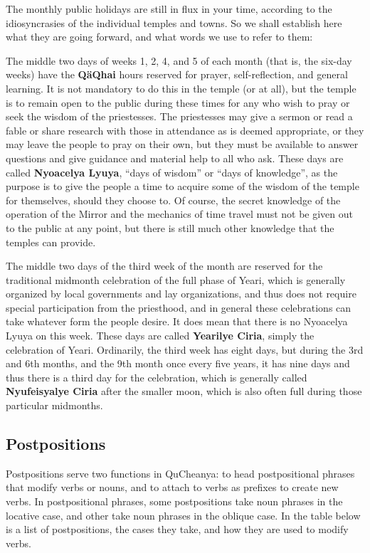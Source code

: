 \documentclass{article}
\begin{document}
The monthly public holidays are still in flux in your time, according to the idiosyncrasies of the individual temples and towns.  So we shall establish here what they are going forward, and what words we use to refer to them:

The middle two days of weeks 1, 2, 4, and 5 of each month (that is, the six-day weeks) have the \textbf{Q\"aQhai} hours reserved for prayer, self-reflection, and general learning.  It is not mandatory to do this in the temple (or at all), but the temple is to remain open to the public during these times for any who wish to pray or seek the wisdom of the priestesses.  The priestesses may give a sermon or read a fable or share research with those in attendance as is deemed appropriate, or they may leave the people to pray on their own, but they must be available to answer questions and give guidance and material help to all who ask.  These days are called \textbf{Nyoacelya Lyuya}, ``days of wisdom'' or ``days of knowledge'', as the purpose is to give the people a time to acquire some of the wisdom of the temple for themselves, should they choose to.  Of course, the secret knowledge of the operation of the Mirror and the mechanics of time travel must not be given out to the public at any point, but there is still much other knowledge that the temples can provide.

The middle two days of the third week of the month are reserved for the traditional midmonth celebration of the full phase of Yeari, which is generally organized by local governments and lay organizations, and thus does not require special participation from the priesthood, and in general these celebrations can take whatever form the people desire.  It does mean that there is no Nyoacelya Lyuya on this week.  These days are called \textbf{Yearilye Ciria}, simply the celebration of Yeari.  Ordinarily, the third week has eight days, but during the 3rd and 6th months, and the 9th month once every five years, it has nine days and thus there is a third day for the celebration, which is generally called \textbf{Nyufeisyalye Ciria} after the smaller moon, which is also often full during those particular midmonths.

\subsection{Postpositions}
\label{postpositions}

Postpositions serve two functions in QuCheanya: to head postpositional phrases that modify verbs or nouns, and to attach to verbs as prefixes to create new verbs.  In postpositional phrases, some postpositions take noun phrases in the locative case, and other take noun phrases in the oblique case.  In the table below is a list of postpositions, the cases they take, and how they are used to modify verbs.
\end{document}
